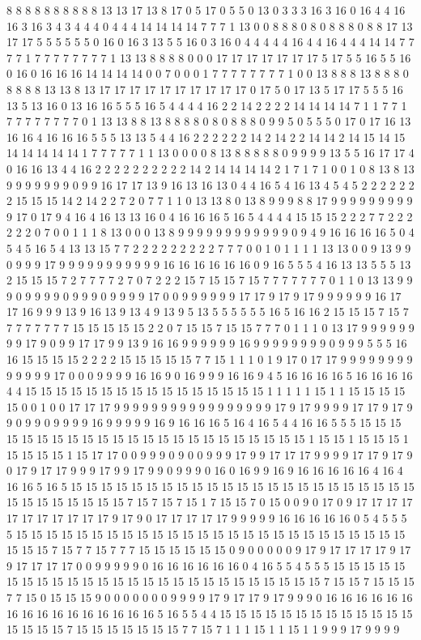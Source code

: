 8 8 8 8 8 8 8 8 8 8 13 13 17 13 8 17 0 5 17 0 5 5 0 13 0 3 3 3 16 3 16 0 16 4 4 16 16 3 16 3 4 3 4 4 4 0 4 4 4 14 14 14 14 7 7 7 1 13 0 0 8 8 8 0 8 0 8 8 8 0 8 8 17 13 17 17 5 5 5 5 5 5 0 16 0 16 3 13 5 5 16 0 3 16 0 4 4 4 4 4 16 4 4 16 4 4 4 14 14 7 7 7 7 1 7 7 7 7 7 7 7 7 1 13 13 8 8 8 8 0 0 0 17 17 17 17 17 17 17 5 17 5 5 16 5 5 16 0 16 0 16 16 16 14 14 14 14 0 0 7 0 0 0 1 7 7 7 7 7 7 7 7 1 0 0 13 8 8 8 13 8 8 8 0 8 8 8 8 13 13 8 13 17 17 17 17 17 17 17 17 17 17 0 17 5 0 17 13 5 17 17 5 5 5 16 13 5 13 16 0 13 16 16 5 5 5 16 5 4 4 4 4 16 2 2 14 2 2 2 2 14 14 14 14 7 1 1 7 7 1 7 7 7 7 7 7 7 7 0 1 13 13 8 8 13 8 8 8 8 0 8 0 8 8 8 0 9 9 5 0 5 5 5 0 17 0 17 16 13 16 16 4 16 16 16 5 5 5 13 13 5 4 4 16 2 2 2 2 2 2 14 2 14 2 2 14 14 2 14 15 14 15 14 14 14 14 14 1 7 7 7 7 7 1 1 13 0 0 0 0 8 13 8 8 8 8 8 0 9 9 9 9 13 5 5 16 17 17 4 0 16 16 13 4 4 16 2 2 2 2 2 2 2 2 2 2 14 2 14 14 14 14 2 1 7 1 7 1 0 0 1 0 8 13 8 13 9 9 9 9 9 9 9 0 9 9 16 17 17 13 9 16 13 16 13 0 4 4 16 5 4 16 13 4 5 4 5 2 2 2 2 2 2 2 15 15 15 14 2 14 2 2 7 2 0 7 7 1 1 0 13 13 8 0 13 8 9 9 9 8 8 17 9 9 9 9 9 9 9 9 9 9 17 0 17 9 4 16 4 16 13 13 16 0 4 16 16 16 5 16 5 4 4 4 4 15 15 15 2 2 2 7 7 2 2 2 2 2 2 0 7 0 0 1 1 1 8 13 0 0 0 13 8 9 9 9 9 9 9 9 9 9 9 9 9 0 9 4 9 16 16 16 16 5 0 4 5 4 5 16 5 4 13 13 15 7 7 2 2 2 2 2 2 2 2 2 7 7 7 0 0 1 0 1 1 1 1 13 13 0 0 9 13 9 9 0 9 9 9 17 9 9 9 9 9 9 9 9 9 9 9 16 16 16 16 16 16 0 9 16 5 5 5 4 16 13 13 5 5 5 13 2 15 15 15 7 2 7 7 7 7 2 7 0 7 2 2 2 15 7 15 15 7 15 7 7 7 7 7 7 7 0 1 1 0 13 13 9 9 9 0 9 9 9 9 0 9 9 9 0 9 9 9 9 17 0 0 9 9 9 9 9 9 17 17 9 17 9 17 9 9 9 9 9 9 16 17 17 16 9 9 9 13 9 16 13 9 13 4 9 13 9 5 13 5 5 5 5 5 5 16 5 16 16 2 15 15 15 7 15 7 7 7 7 7 7 7 7 15 15 15 15 15 2 2 0 7 15 15 7 15 15 7 7 7 0 1 1 1 0 13 17 9 9 9 9 9 9 9 9 17 9 0 9 9 17 17 9 9 13 9 16 16 9 9 9 9 9 9 16 9 9 9 9 9 9 9 9 0 9 9 9 5 5 5 16 16 15 15 15 15 2 2 2 2 15 15 15 15 15 7 7 15 1 1 1 0 1 9 17 0 17 17 9 9 9 9 9 9 9 9 9 9 9 9 9 17 0 0 0 9 9 9 9 16 16 9 0 16 9 9 9 16 16 9 4 5 16 16 16 16 5 16 16 16 16 4 4 15 15 15 15 15 15 15 15 15 15 15 15 15 15 15 15 1 1 1 1 1 15 1 1 15 15 15 15 15 0 0 1 0 0 17 17 17 9 9 9 9 9 9 9 9 9 9 9 9 9 9 9 9 9 17 9 17 9 9 9 9 17 17 9 17 9 9 0 9 9 0 9 9 9 9 16 9 9 9 9 9 16 9 16 16 16 5 16 4 16 5 4 4 16 16 5 5 5 15 15 15 15 15 15 15 15 15 15 15 15 15 15 15 15 15 15 15 15 15 15 15 1 15 15 1 15 15 15 1 15 15 15 15 1 15 17 17 0 0 9 9 9 0 9 0 0 9 9 9 17 9 9 17 17 17 9 9 9 9 17 17 9 17 9 0 17 9 17 17 9 9 9 17 9 9 17 9 9 0 9 9 9 0 16 0 16 9 9 16 9 16 16 16 16 16 4 16 4 16 16 5 16 5 15 15 15 15 15 15 15 15 15 15 15 15 15 15 15 15 15 15 15 15 15 15 15 15 15 15 15 15 15 15 15 7 15 7 15 7 15 1 7 15 15 7 0 15 0 0 9 0 17 0 9 17 17 17 17 17 17 17 17 17 17 17 9 17 9 0 17 17 17 17 17 9 9 9 9 9 16 16 16 16 16 0 5 4 5 5 5 5 15 15 15 15 15 15 15 15 15 15 15 15 15 15 15 15 15 15 15 15 15 15 15 15 15 15 15 15 15 7 15 7 7 15 7 7 7 15 15 15 15 15 15 0 9 0 0 0 0 0 9 17 9 17 17 17 17 9 17 9 17 17 17 17 0 0 9 9 9 9 9 0 16 16 16 16 16 16 0 4 16 5 5 4 5 5 5 15 15 15 15 15 15 15 15 15 15 15 15 15 15 15 15 15 15 15 15 15 15 15 15 15 15 7 15 15 7 15 15 15 7 7 15 0 15 15 15 9 0 0 0 0 0 0 0 9 9 9 9 17 9 17 17 9 17 9 9 9 0 16 16 16 16 16 16 16 16 16 16 16 16 16 16 16 16 5 16 5 5 4 4 15 15 15 15 15 15 15 15 15 15 15 15 15 15 15 15 15 7 15 15 15 15 15 15 15 7 7 15 7 1 1 1 15 1 1 15 1 1 9 9 9 17 9 9 9 9 